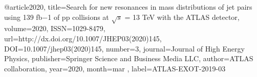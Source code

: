 @article{2020, 
    title={Search for new resonances in mass distributions of jet pairs using 139 fb−1 of pp collisions at $ \sqrt{s} $ = 13 TeV with the ATLAS detector}, 
    volume={2020}, 
    ISSN={1029-8479}, 
    url={http://dx.doi.org/10.1007/JHEP03(2020)145}, 
    DOI={10.1007/jhep03(2020)145}, 
    number={3}, 
    journal={Journal of High Energy Physics}, 
    publisher={Springer Science and Business Media LLC}, 
    author={ATLAS collaboration}, 
    year={2020}, 
    month=mar ,
    label={ATLAS-EXOT-2019-03}
}

